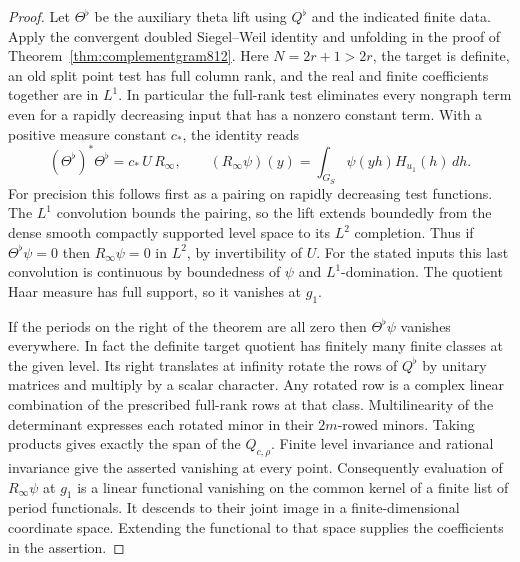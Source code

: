 \documentclass[a4paper,11pt]{article}
\theoremstyle{definition}
\theoremstyle{remark}
\numberwithin{equation}{section}
\begin{document}
\begin{proof}
Let \(\Theta^\flat\) be the auxiliary theta lift using
\(Q^\flat\) and the indicated finite data.
Apply the convergent doubled Siegel--Weil identity and
unfolding in the proof of Theorem~\ref{thm:complementgram812}.
Here \(N=2r+1>2r\), the target
is definite, an old split point test has full column rank,
and the real and finite coefficients together are in
\(L^1\). In particular the full-rank test eliminates
every nongraph term even for a rapidly decreasing input
that has a nonzero constant term. With a positive measure
constant \(c_*\), the identity reads
\[
  (\Theta^\flat)^*\Theta^\flat=c_*\,U\,R_\infty,\qquad
  (R_\infty\psi)(y)=\int_{G_S}\psi(yh)H_{u_1}(h)\,dh .
\]
For precision this follows first as a pairing on rapidly
decreasing test functions. The \(L^1\) convolution bounds
the pairing, so the lift extends boundedly from the dense
smooth compactly supported level space to its \(L^2\)
completion. Thus if \(\Theta^\flat\psi=0\) then
\(R_\infty\psi=0\) in \(L^2\), by invertibility of \(U\).
For the stated inputs this last convolution is continuous
by boundedness of \(\psi\) and \(L^1\)-domination. The
quotient Haar measure has full support, so it vanishes
at \(g_1\).

If the periods on the right of the theorem are all zero
then \(\Theta^\flat\psi\) vanishes everywhere. In fact the
definite target quotient has finitely many finite classes
at the given level. Its right translates at infinity
rotate the rows of \(Q^\flat\) by unitary matrices and
multiply by a scalar character. Any rotated row is a
complex linear combination of the prescribed full-rank
rows at that class. Multilinearity of the determinant
expresses each rotated minor in their \(2m\)-rowed minors.
Taking products gives exactly the span of the \(Q_{c,\rho}\).
Finite level invariance and rational invariance give the
asserted vanishing at every point.
Consequently evaluation of \(R_\infty\psi\) at \(g_1\) is
a linear functional vanishing on the common kernel of a
finite list of period functionals. It descends to their
joint image in a finite-dimensional coordinate space.
Extending the functional to that space supplies the
coefficients in the assertion.
\end{proof}
\end{document}
